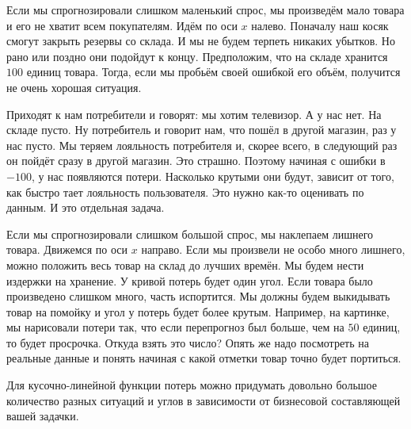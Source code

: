 \documentclass[12pt, a4paper, oneside]{article}
\theoremstyle{plain} %
\theoremstyle{definition}
\begin{document}
\begin{solution}
\begin{itemize}
\begin{center}
\end{center}

Если мы спрогнозировали слишком маленький спрос, мы произведём мало товара и его не хватит всем покупателям. Идём по оси $x$ налево. Поначалу наш косяк смогут закрыть резервы со склада. И мы не будем терпеть никаких убытков. Но рано или поздно они подойдут к концу. Предположим, что на складе хранится $100$ единиц товара. Тогда, если мы пробьём своей ошибкой его объём, получится не очень хорошая ситуация. 

Приходят к нам потребители и говорят: мы хотим телевизор. А у нас нет. На складе пусто. Ну потребитель и говорит нам, что пошёл в другой магазин, раз у нас пусто. Мы теряем лояльность потребителя и, скорее всего, в следующий раз он пойдёт сразу в другой магазин. Это страшно. Поэтому начиная с ошибки в $-100$, у нас появляются потери. Насколько крутыми они будут, зависит от того, как быстро тает лояльность пользователя. Это нужно как-то оценивать по данным. И это отдельная задача. 

Если мы спрогнозировали слишком большой спрос, мы наклепаем лишнего товара. Движемся по оси $x$ направо. Если мы произвели не особо много лишнего, можно положить весь товар на склад до лучших времён. Мы будем нести издержки на хранение. У кривой потерь будет один угол. Если товара было произведено слишком много, часть испортится. Мы должны будем выкидывать товар на помойку и угол у потерь будет более крутым. Например, на картинке, мы нарисовали потери так, что если перепрогноз был больше, чем на $50$ единиц, то будет просрочка. Откуда взять это число? Опять же надо посмотреть на реальные данные и понять начиная с какой отметки товар точно будет портиться. 

Для кусочно-линейной функции потерь можно придумать довольно большое количество разных ситуаций и углов в зависимости от бизнесовой составляющей вашей задачки. 


\end{itemize}
\end{solution}
\end{document}
